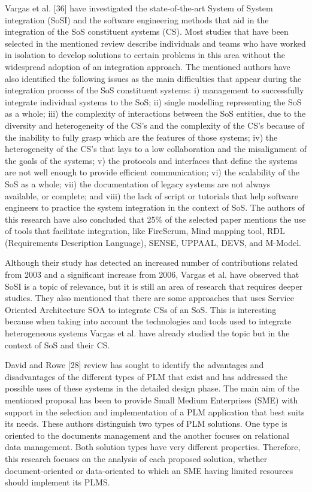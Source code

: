 \documentclass[peerreview]{IEEEtran}
\begin{document}
Vargas et al. [36] have investigated the state-of-the-art System of System integration (SoSI) and the software engineering methods that aid in the integration of the SoS constituent systems (CS). Most studies that have been selected in the mentioned review describe individuals and teams who have worked in isolation to develop solutions to certain problems in this area without the widespread adoption of an integration approach. The mentioned authors have also identified the following issues as the main difficulties that appear during the integration process of the SoS constituent systems: i) management to successfully integrate individual systems to the SoS; ii) single modelling representing the SoS as a whole; iii) the complexity of interactions between the SoS entities, due to the diversity and heterogeneity of the CS’s and the complexity of the CS’s because of the inability to fully grasp which are the features of those systems; iv) the heterogeneity of the CS’s that lays to a low collaboration and the misalignment of the goals of the systems; v) the protocols and interfaces that define the systems are not well enough to provide efficient communication; vi) the scalability of the SoS as a whole; vii) the documentation of legacy systems are not always available, or complete; and viii) the lack of script or tutorials that help software engineers to practice the system integration in the context of SoS. The authors of this research have also concluded that 25\% of the selected paper mentions the use of tools that facilitate integration, like FireScrum, Mind mapping tool, RDL (Requirements Description Language), SENSE, UPPAAL, DEVS, and M-Model.


Although their study has detected an increased number of contributions related from 2003 and a significant increase from 2006, Vargas et al. have observed that SoSI is a topic of relevance, but it is still an area of research that requires deeper studies. They also mentioned that there are some approaches that uses Service Oriented Architecture SOA to integrate CSs of an SoS. This is interesting because when taking into account the technologies and tools used to integrate heterogeneous systems Vargas et al. have already studied the topic but in the context of SoS and their CS. 


David and Rowe [28] review has sought to identify the advantages and disadvantages of the different types of PLM that exist and has addressed the possible uses of these systems in the detailed design phase. The main aim of the mentioned proposal has been to provide Small Medium Enterprises (SME) with support in the selection and implementation of a PLM application that best suits its needs. These authors distinguish two types of PLM solutions. One type is oriented to the documents management and the another focuses on relational data management. Both solution types have very different properties. Therefore, this research focuses on the analysis of each proposed solution, whether document-oriented or data-oriented to which an SME having limited resources should implement its PLMS. 
\end{document}
